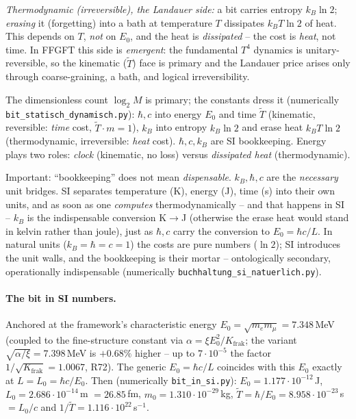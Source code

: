 \emph{Thermodynamic (irreversible), the Landauer side:} a bit carries entropy $k_B\ln 2$; \emph{erasing}
it (forgetting) into a bath at temperature $T$ dissipates $k_B T\ln 2$ of heat. This depends on $T$,
\emph{not} on $E_0$, and the heat is \emph{dissipated} -- the cost is \emph{heat}, not time. In FFGFT this
side is \emph{emergent}: the fundamental $T^4$ dynamics is unitary-reversible, so the kinematic
($\tilde T$) face is primary and the Landauer price arises only through coarse-graining, a bath, and
logical irreversibility.

The dimensionless count $\log_2 M$ is primary; the constants dress it (numerically
\texttt{bit\_statisch\_dynamisch.py}): $\hbar,c$ into energy $E_0$ and time $\tilde T$ (kinematic,
reversible: \emph{time} cost, $\tilde T\cdot m=1$), $k_B$ into entropy $k_B\ln 2$ and erase heat
$k_B T\ln 2$ (thermodynamic, irreversible: \emph{heat} cost). $\hbar,c,k_B$ are SI bookkeeping. Energy
plays two roles: \emph{clock} (kinematic, no loss) versus \emph{dissipated heat} (thermodynamic).

Important: \enquote{bookkeeping} does not mean \emph{dispensable}. $k_B,\hbar,c$ are the \emph{necessary}
unit bridges. SI separates temperature (K), energy (J), time (s) into their own units, and as soon as one
\emph{computes} thermodynamically -- and that happens in SI -- $k_B$ is the indispensable conversion
K$\to$J (otherwise the erase heat would stand in kelvin rather than joule), just as $\hbar,c$ carry the
conversion to $E_0=\hbar c/L$. In natural units ($k_B=\hbar=c=1$) the costs are pure numbers ($\ln 2$); SI
introduces the unit walls, and the bookkeeping is their mortar -- ontologically secondary, operationally
indispensable (numerically \texttt{buchhaltung\_si\_natuerlich.py}).

\paragraph{The bit in SI numbers.} Anchored at the framework's characteristic energy
$E_0=\sqrt{m_e m_\mu}=7.348$\,MeV (coupled to the fine-structure constant via $\alpha=\xi E_0^2/K_{\text{frak}}$; the
variant $\sqrt{\alpha/\xi}=7.398$\,MeV is $+0.68\%$ higher -- up to $7\cdot10^{-5}$ the factor $1/\sqrt{K_{\text{frak}}} = 1.0067$, R72). The generic
$E_0=\hbar c/L$ coincides with this $E_0$ exactly at $L=L_0=\hbar c/E_0$. Then (numerically
\texttt{bit\_in\_si.py}): $E_0=1.177\cdot10^{-12}$\,J, $L_0=2.686\cdot10^{-14}$\,m $=26.85$\,fm,
$m_0=1.310\cdot10^{-29}$\,kg, $\tilde T=\hbar/E_0=8.958\cdot10^{-23}$\,s $=L_0/c$ and
$1/\tilde T=1.116\cdot10^{22}$\,s$^{-1}$.

